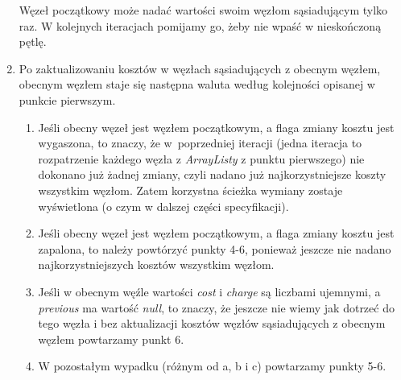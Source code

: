 \documentclass[a4paper,11pt]{article}
\begin{document}
\begin{enumerate}
Węzeł początkowy może nadać wartości swoim węzłom sąsiadującym tylko raz. W kolejnych iteracjach pomijamy go, żeby nie wpaść w nieskończoną pętlę.
\item Po zaktualizowaniu kosztów w węzłach sąsiadujących z obecnym węzłem, obecnym węzłem staje się następna waluta według kolejności opisanej w punkcie pierwszym.
\begin{enumerate}
\item Jeśli obecny węzeł jest węzłem początkowym, a flaga zmiany kosztu jest wygaszona, to znaczy, że w~poprzedniej iteracji (jedna iteracja to rozpatrzenie każdego węzła z \textit{ArrayListy} z punktu pierwszego) nie dokonano już żadnej zmiany, czyli nadano już najkorzystniejsze koszty wszystkim węzłom. Zatem korzystna ścieżka wymiany zostaje wyświetlona (o czym w dalszej części specyfikacji).
\item Jeśli obecny węzeł jest węzłem początkowym, a flaga zmiany kosztu jest zapalona, to należy powtórzyć punkty 4-6, ponieważ jeszcze nie nadano najkorzystniejszych kosztów wszystkim węzłom.
\item Jeśli w obecnym węźle wartości \textit{cost} i \textit{charge} są liczbami ujemnymi, a \textit{previous} ma wartość \textit{null}, to znaczy, że jeszcze nie wiemy jak dotrzeć do tego węzła i bez aktualizacji kosztów węzłów sąsiadujących z obecnym węzłem powtarzamy punkt 6.
\item W pozostałym wypadku (różnym od a, b i c) powtarzamy punkty 5-6.
\end{enumerate}
\end{enumerate}
\end{document}
